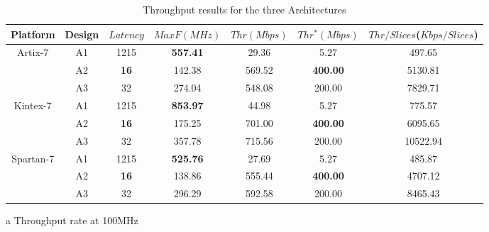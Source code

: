 \documentclass[final,5p,times,twocolumn]{elsarticle}
\begin{document}
\begin{table}
    \begin{threeparttable}
        \caption{Throughput results for the three Architectures}\label{throughput_compare}%
        \begin{tabular*}{\textwidth}{@{\extracolsep\fill}|c|c|c|c|c|c|c|}
            \hline
            Platform & Design & $Latency$ & $MaxF(MHz)$ & $Thr(Mbps)$ & $Thr^*(Mbps)$\tnote{a} & $Thr/Slices$($Kbps/Slices$) \\
            \hline
            \multirow{3}{*}{Artix-7}  & A1 & 1215 & \textbf{557.41} & 29.36 & 5.27 & 497.65 \\
            & A2 & \textbf{16} & 142.38 & 569.52 & \textbf{400.00} & 5130.81 \\
            & A3 & 32 & 274.04 & 548.08 & 200.00 & 7829.71 \\
            \hline
            \multirow{3}{*}{Kintex-7} & A1 & 1215 & \textbf{853.97} & 44.98 & 5.27 & 775.57 \\
            & A2 & \textbf{16} & 175.25 & 701.00 & \textbf{400.00} & 6095.65 \\
            & A3 & 32 & 357.78 & 715.56 & 200.00 & 10522.94 \\
            \hline
            \multirow{3}{*}{Spartan-7} & A1 & 1215 & \textbf{525.76} & 27.69 & 5.27 & 485.87 \\
            & A2 & \textbf{16} & 138.86 & 555.44 & \textbf{400.00} & 4707.12 \\
            & A3 & 32 & 296.29 & 592.58 & 200.00 & 8465.43 \\
            \hline
        \end{tabular*}
        \begin{tablenotes}
            \item[a] Throughput rate at 100MHz
        \end{tablenotes}
    \end{threeparttable}
\end{table}
\end{document}
